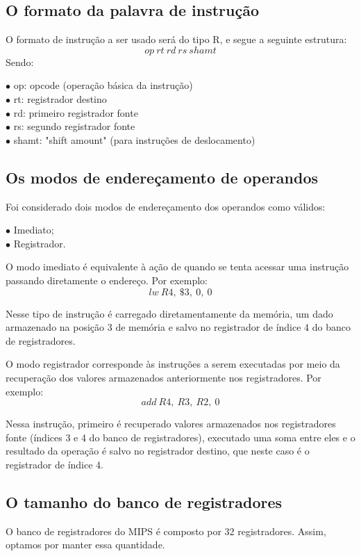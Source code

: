 \documentclass[12pt]{article}
\begin{document}
\subsection{O formato da palavra de instrução}

O formato de instrução a ser usado será do tipo R, e segue a seguinte estrutura:
$$op \ rt \ rd \ rs \ shamt$$
Sendo:

\setlength{\parindent}{0cm}
$\bullet$ op: opcode (operação básica da instrução)\\
$\bullet$ rt: registrador destino\\
$\bullet$ rd: primeiro registrador fonte\\
$\bullet$ rs: segundo registrador fonte\\
$\bullet$ shamt: "shift amount" (para instruções de deslocamento)

\subsection{Os modos de endereçamento de operandos}
Foi considerado dois modos de endereçamento dos operandos como válidos:

$\bullet$ Imediato;\\
$\bullet$ Registrador.

\setlength{\parindent}{1.5cm}
O modo imediato é equivalente à ação de quando se tenta acessar uma instrução passando diretamente o endereço. 
Por exemplo:
$$lw \ R4, \ \$3, \ 0, \ 0$$

Nesse tipo de instrução é carregado diretamentamente da memória, um dado armazenado na posição 3 de memória e salvo no registrador de índice 4 do banco de registradores.

O modo registrador corresponde às instruções a serem executadas por meio da recuperação dos valores armazenados anteriormente nos registradores.
Por exemplo:
$$add \ R4, \ R3, \ R2, \ 0$$

Nessa instrução, primeiro é recuperado valores armazenados nos registradores fonte (índices 3 e 4 do banco de registradores), executado uma soma entre eles e o resultado da operação é salvo no registrador destino, que neste caso é o registrador de índice 4.

\subsection{O tamanho do banco de registradores}
O banco de registradores do MIPS é composto por 32 registradores. Assim, optamos por manter essa quantidade.
\end{document}
